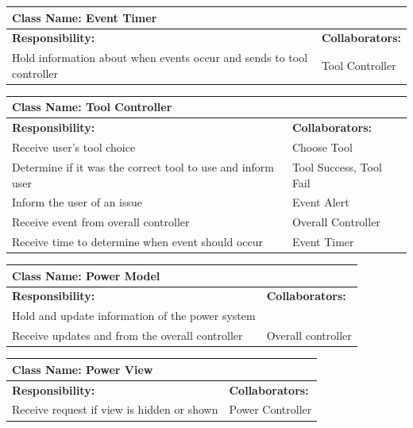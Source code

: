 \documentclass[12pt, titlepage]{article}
\begin{document}
	\begin{table}[H]
		\centering
		\begin{tabular}{|p{10cm}|p{5cm}|}
		\hline 
		 \multicolumn{2}{|l|}{\textbf{Class Name: Event Timer}} \\
		\hline
		\textbf{Responsibility:} & \textbf{Collaborators:} \\
		\hline
		 Hold information about when events occur and sends to tool controller & Tool Controller\\
		\hline
		\end{tabular}
	\end{table}

	\begin{table}[H]
		\centering
		\begin{tabular}{|p{10cm}|p{5cm}|}
		\hline 
		 \multicolumn{2}{|l|}{\textbf{Class Name: Tool Controller}} \\
		\hline
		\textbf{Responsibility:} & \textbf{Collaborators:} \\
		\hline
		 Receive user's tool choice & Choose Tool\\
		\hline
		 Determine if it was the correct tool to use and inform user & Tool Success, Tool Fail \\
		\hline
		 Inform the user of an issue & Event Alert \\
		\hline
		 Receive event from overall controller & Overall Controller \\
		\hline
		Receive time to determine when event should occur & Event Timer \\
		\hline
		\end{tabular}
	\end{table}

	\begin{table}[H]
		\centering
		\begin{tabular}{|p{10cm}|p{5cm}|}
		\hline 
		 \multicolumn{2}{|l|}{\textbf{Class Name: Power Model}} \\
		\hline
		\textbf{Responsibility:} & \textbf{Collaborators:} \\
		\hline
		 Hold and update information of the power system & \\
		\hline
		Receive updates and from the overall controller & Overall controller \\
		\hline
		\end{tabular}
	\end{table}

	\begin{table}[H]
		\centering
		\begin{tabular}{|p{10cm}|p{5cm}|}
		\hline 
		 \multicolumn{2}{|l|}{\textbf{Class Name: Power View}} \\
		\hline
		\textbf{Responsibility:} & \textbf{Collaborators:} \\
		\hline 
		 Receive request if view is hidden or shown & Power Controller\\
		\hline
		\end{tabular}
	\end{table}
\end{document}
